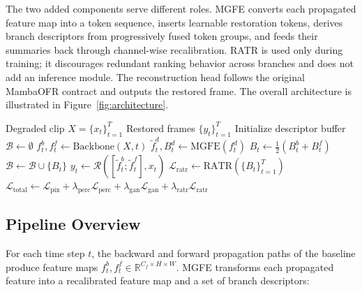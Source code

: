 The two added components serve different roles. MGFE converts each propagated feature map into a token sequence, inserts learnable restoration tokens, derives branch descriptors from progressively fused token groups, and feeds their summaries back through channel-wise recalibration. RATR is used only during training; it discourages redundant ranking behavior across branches and does not add an inference module. The reconstruction head follows the original MambaOFR contract and outputs the restored frame. The overall architecture is illustrated in Figure~\ref{fig:architecture}.

\begin{algorithm}[H]
\caption{MgfrOFR forward pass for a clip of length $T$.\label{alg:mgfrofr}}
\begin{algorithmic}[1]
\Require Degraded clip $X=\{x_t\}_{t=1}^{T}$
\Ensure Restored frames $\{y_t\}_{t=1}^{T}$
\State Initialize descriptor buffer $\mathcal{B} \leftarrow \emptyset$
    \State $f_t^{b}, f_t^{f} \leftarrow \text{Backbone}(X, t)$ 
        \State $\widetilde{f}_t^{d}, B_t^{d} \leftarrow \text{MGFE}(f_t^{d})$ 
    \EndFor
    \State $B_t \leftarrow \frac{1}{2}(B_t^{b} + B_t^{f})$ 
    \State $\mathcal{B} \leftarrow \mathcal{B} \cup \{B_t\}$ 
    \State $y_t \leftarrow \mathcal{R}([\widetilde{f}_t^{b}; \widetilde{f}_t^{f}], x_t)$ 
\EndFor
{}
    \State $\mathcal{L}_{\text{ratr}} \leftarrow \text{RATR}(\{B_t\}_{t=1}^{T})$ 
    \State $\mathcal{L}_{\text{total}} \leftarrow \mathcal{L}_{\text{pix}} + \lambda_{\text{perc}}\mathcal{L}_{\text{perc}} + \lambda_{\text{gan}}\mathcal{L}_{\text{gan}} + \lambda_{\text{ratr}}\mathcal{L}_{\text{ratr}}$
\EndIf
\end{algorithmic}
\end{algorithm}

\subsection{Pipeline Overview}
\label{subsec:overview}

For each time step $t$, the backward and forward propagation paths of the baseline produce feature maps $f_t^{b}, f_t^{f} \in \mathbb{R}^{C_f \times H \times W}$. MGFE transforms each propagated feature into a recalibrated feature map and a set of branch descriptors:

